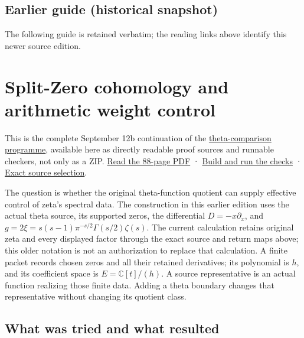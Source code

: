 \documentclass[
]{article}
\begin{document}
\subsection{Earlier guide (historical
snapshot)}\label{earlier-guide-historical-snapshot}

The following guide is retained verbatim; the reading links above
identify this newer source edition.

\section{Split-Zero cohomology and arithmetic weight
control}\label{split-zero-cohomology-and-arithmetic-weight-control}

This is the complete September 12b continuation of the
\href{../../RESEARCH_PROGRAMMES.md}{theta-comparison programme},
available here as directly readable proof sources and runnable checkers,
not only as a ZIP.
\href{Split_Zero_Cohomology_and_Arithmetic_Weight_Control.pdf}{Read the
88-page PDF} · \href{BUILDING.md}{Build and run the checks} ·
\href{SOURCE_SELECTION.json}{Exact source selection}.

The question is whether the original theta-function quotient can supply
effective control of zeta's spectral data. The construction in this
earlier edition uses the actual theta source, its supported zeros, the
differential \(D=-x\partial_x\), and
\(g=2\xi=s(s-1)\pi^{-s/2}\Gamma(s/2)\zeta(s)\). The current calculation
retains original zeta and every displayed factor through the exact
source and return maps above; this older notation is not an
authorization to replace that calculation. A finite packet records
chosen zeros and all their retained derivatives; its polynomial is
\(h\), and its coefficient space is \(E=\mathbb C[t]/(h)\). A source
representative is an actual function realizing those finite data. Adding
a theta boundary changes that representative without changing its
quotient class.

\subsection{What was tried and what
resulted}\label{what-was-tried-and-what-resulted}
\end{document}
